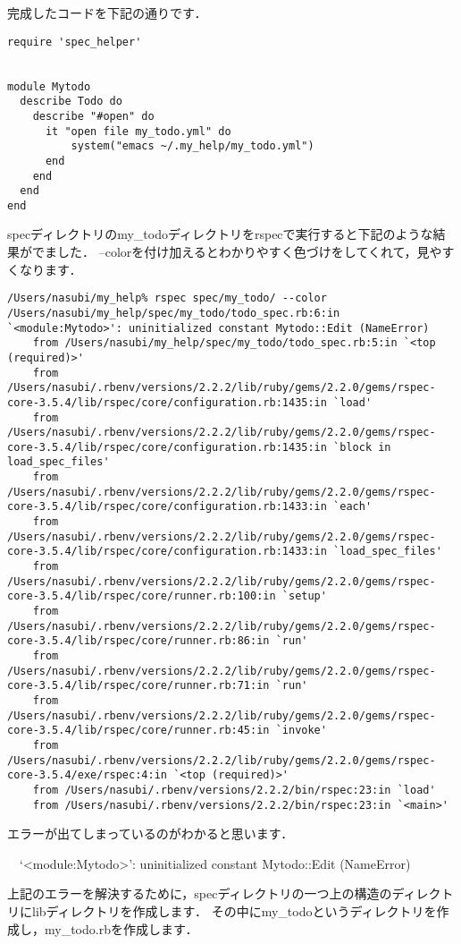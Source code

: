 完成したコードを下記の通りです．
\begin{lstlisting}[style=customRuby,basicstyle={\scriptsize\ttfamily}]
require 'spec_helper'


module Mytodo
  describe Todo do
    describe "#open" do
      it "open file my_todo.yml" do
          system("emacs ~/.my_help/my_todo.yml")
      end
    end
  end
end

\end{lstlisting}
specディレクトリのmy\_todoディレクトリをrspecで実行すると下記のような結果がでました．
--colorを付け加えるとわかりやすく色づけをしてくれて，見やすくなります．
\begin{lstlisting}[style=customCsh,basicstyle={\scriptsize\ttfamily}]
/Users/nasubi/my_help% rspec spec/my_todo/ --color
/Users/nasubi/my_help/spec/my_todo/todo_spec.rb:6:in `<module:Mytodo>': uninitialized constant Mytodo::Edit (NameError)
	from /Users/nasubi/my_help/spec/my_todo/todo_spec.rb:5:in `<top (required)>'
	from /Users/nasubi/.rbenv/versions/2.2.2/lib/ruby/gems/2.2.0/gems/rspec-core-3.5.4/lib/rspec/core/configuration.rb:1435:in `load'
	from /Users/nasubi/.rbenv/versions/2.2.2/lib/ruby/gems/2.2.0/gems/rspec-core-3.5.4/lib/rspec/core/configuration.rb:1435:in `block in load_spec_files'
	from /Users/nasubi/.rbenv/versions/2.2.2/lib/ruby/gems/2.2.0/gems/rspec-core-3.5.4/lib/rspec/core/configuration.rb:1433:in `each'
	from /Users/nasubi/.rbenv/versions/2.2.2/lib/ruby/gems/2.2.0/gems/rspec-core-3.5.4/lib/rspec/core/configuration.rb:1433:in `load_spec_files'
	from /Users/nasubi/.rbenv/versions/2.2.2/lib/ruby/gems/2.2.0/gems/rspec-core-3.5.4/lib/rspec/core/runner.rb:100:in `setup'
	from /Users/nasubi/.rbenv/versions/2.2.2/lib/ruby/gems/2.2.0/gems/rspec-core-3.5.4/lib/rspec/core/runner.rb:86:in `run'
	from /Users/nasubi/.rbenv/versions/2.2.2/lib/ruby/gems/2.2.0/gems/rspec-core-3.5.4/lib/rspec/core/runner.rb:71:in `run'
	from /Users/nasubi/.rbenv/versions/2.2.2/lib/ruby/gems/2.2.0/gems/rspec-core-3.5.4/lib/rspec/core/runner.rb:45:in `invoke'
	from /Users/nasubi/.rbenv/versions/2.2.2/lib/ruby/gems/2.2.0/gems/rspec-core-3.5.4/exe/rspec:4:in `<top (required)>'
	from /Users/nasubi/.rbenv/versions/2.2.2/bin/rspec:23:in `load'
	from /Users/nasubi/.rbenv/versions/2.2.2/bin/rspec:23:in `<main>'

\end{lstlisting}
エラーが出てしまっているのがわかると思います．

　`<module:Mytodo>': uninitialized constant Mytodo::Edit (NameError)

上記のエラーを解決するために，specディレクトリの一つ上の構造のディレクトリにlibディレクトリを作成します．
その中にmy\_todoというディレクトリを作成し，my\_todo.rbを作成します．

